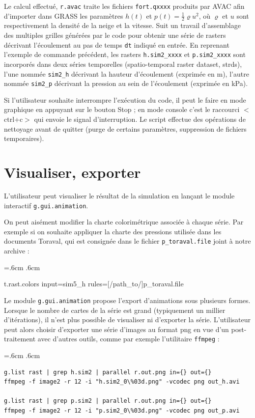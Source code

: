 \documentclass[12pt,oneside]{paper}
\newenvironment{code}{%
\vspace{2mm}%
\hangindent=.6cm%
\parindent.6cm%
\ttfamily%
\color{gris.3}%
}{
\vspace{2mm}%
}
\begin{document}
Le calcul effectué, \verb+r.avac+ traite les fichiers \texttt{fort.qxxxx} produits par AVAC afin d'importer dans GRASS les paramètres $h(t)$ et $p(t)=\frac{1}{2}\varrho {u}^2$, où  $\varrho$ et ${u}$ sont respectivement la densité de la neige et la vitesse. Suit un travail d'assemblage des multiples grilles générées par le code pour obtenir une série de rasters décrivant l'écoulement au pas de temps \texttt{dt} indiqué en entrée. En reprenant l'exemple de commande précédent, les rasters \texttt{h.sim2\_xxxx} et \texttt{p.sim2\_xxxx} sont incorporés dans deux séries temporelles (spatio-temporal raster dataset, strds), l'une nommée \texttt{sim2\_h} décrivant la hauteur d'écoulement (exprimée en m), l'autre nommée \texttt{sim2\_p} décrivant la pression au sein de l'écoulement (exprimée en kPa).

Si l'utilisateur souhaite interrompre l'exécution du code, il peut le faire en mode graphique en appuyant sur le bouton Stop ; en mode console c'est le raccourci  $<$ctrl+c$>$ qui envoie le signal d'interruption. Le script effectue des opérations de nettoyage avant de quitter (purge de certains paramètres, suppression de fichiers temporaires).

\section{Visualiser, exporter}

L'utilisateur peut visualiser le résultat de la simulation en lançant le module interactif \texttt{g.gui.animation}.

On peut aisément modifier la charte colorimétrique associée à chaque série. Par exemple si on souhaite appliquer la charte des pressions utilisée dans les documents Toraval, qui est consignée dans le fichier \texttt{p\_toraval.file} joint à notre archive :

\begin{code}
t.rast.colors input=sim5\_h rules=[/path\_to/]p\_toraval.file
\end{code}


Le module \texttt{g.gui.animation} propose l'export d'animations sous plusieurs formes. Lorsque le nombre de cartes de la série est grand (typiquement un millier d'itérations), il n'est plus possible de visualiser ni d'exporter la série. L'utilisa\-teur peut alors choisir d'exporter une série d'images au format png en vue d'un post-traitement avec d'autres outils, comme par exemple l'utilitaire \verb+ffmpeg+ :

\begin{code}
\begin{Verbatim}
g.list rast | grep h.sim2 | parallel r.out.png in={} out={}
ffmpeg -f image2 -r 12 -i "h.sim2_0\%03d.png" -vcodec png out_h.avi

g.list rast | grep p.sim2 | parallel r.out.png in={} out={}
ffmpeg -f image2 -r 12 -i "p.sim2_0\%03d.png" -vcodec png out_p.avi
\end{Verbatim}
\end{code}
\end{document}

